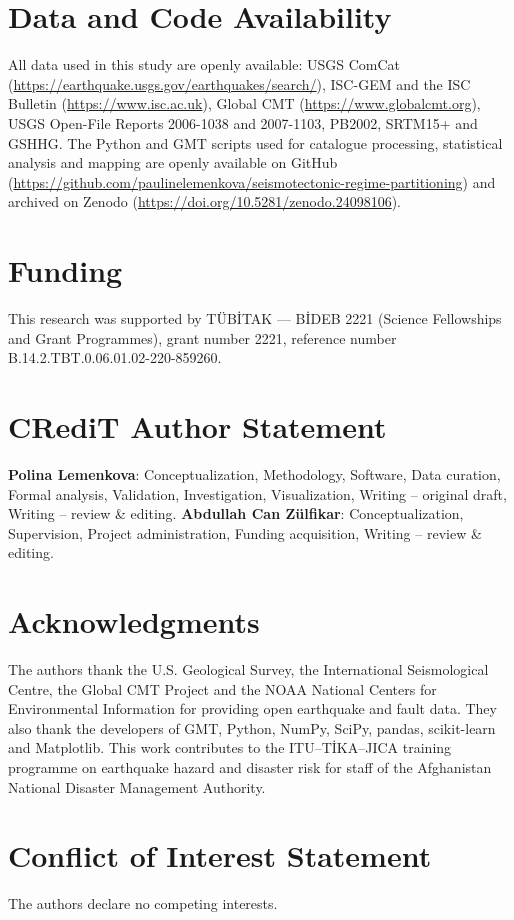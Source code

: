 \documentclass[11pt]{article}
\begin{document}
\section*{Data and Code Availability}
All data used in this study are openly available: USGS ComCat
(\url{https://earthquake.usgs.gov/earthquakes/search/}), ISC-GEM and the ISC
Bulletin (\url{https://www.isc.ac.uk}), Global CMT (\url{https://www.globalcmt.org}),
USGS Open-File Reports 2006-1038 and 2007-1103, PB2002, SRTM15+ and GSHHG.
The Python and GMT scripts used for catalogue processing, statistical analysis and
mapping are openly available on GitHub
(\url{https://github.com/paulinelemenkova/seismotectonic-regime-partitioning}) and
archived on Zenodo (\url{https://doi.org/10.5281/zenodo.24098106}).

\section*{Funding}
This research was supported by T\"{U}B\.{I}TAK --- B\.{I}DEB 2221 (Science
Fellowships and Grant Programmes), grant number 2221, reference number
B.14.2.TBT.0.06.01.02-220-859260.

\section*{CRediT Author Statement}
\textbf{Polina Lemenkova}: Conceptualization, Methodology, Software, Data curation,
Formal analysis, Validation, Investigation, Visualization, Writing -- original draft,
Writing -- review \& editing. \textbf{Abdullah Can Z\"{u}lfikar}: Conceptualization,
Supervision, Project administration, Funding acquisition, Writing -- review \&
editing.

\section*{Acknowledgments}
The authors thank the U.S. Geological Survey, the International Seismological
Centre, the Global CMT Project and the NOAA National Centers for Environmental
Information for providing open earthquake and fault data. They also thank the developers of
GMT, Python, NumPy, SciPy, pandas, scikit-learn and Matplotlib. This work contributes to
the ITU--T\.{I}KA--JICA training programme on earthquake hazard and disaster risk
for staff of the Afghanistan National Disaster Management Authority.

\section*{Conflict of Interest Statement}
The authors declare no competing interests.
\end{document}
